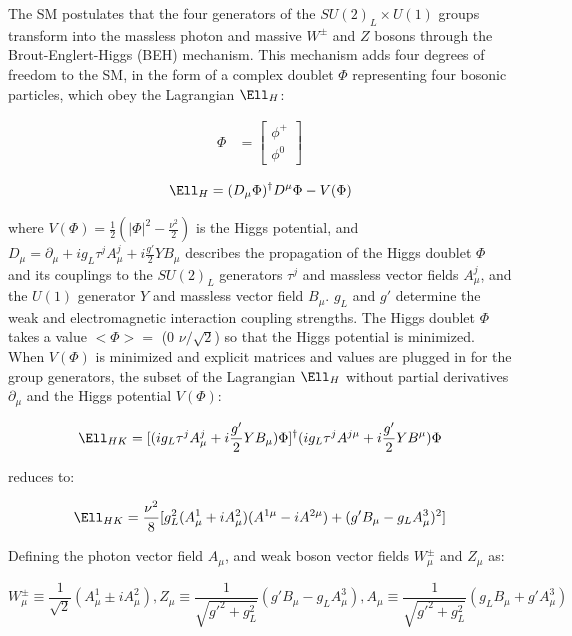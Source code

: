 The SM postulates that the four generators of the $SU(2)_{L} \times U(1)$ groups transform into the massless 
photon and massive $W^{\pm}$ and $Z$ bosons through the Brout-Englert-Higgs (BEH) mechanism.  This mechanism 
adds four degrees of freedom to the SM, in the form of a complex doublet $\Phi$ representing four bosonic 
particles, which obey the Lagrangian $\Ell_{H}$:

\begin{align}
	\Phi &= \begin{bmatrix}
	\phi^{+} \\
	\phi^{0}
	\end{bmatrix}
\end{align}

\begin{equation}
	\Ell_{H} = (D_{\mu}\Phi)^{\dagger}D^{\mu}\Phi - V(\Phi)
\end{equation}

where $V(\Phi) = \frac{1}{2}(|\Phi|^{2} - \frac{\nu^{2}}{2})$ is the Higgs potential, and 
$D_{\mu} = \partial_{\mu} + ig_{L}\tau^{j}A^{j}_{\mu} + i\frac{g'}{2}YB_{\mu}$ describes the propagation 
of the Higgs doublet $\Phi$ and its couplings to the $SU(2)_L$ generators $\tau^{j}$ and massless vector 
fields $A^{j}_{\mu}$, and the $U(1)$ generator $Y$ and massless vector field $B_{\mu}$.  $g_{L}$ and 
$g'$ determine the weak and electromagnetic interaction coupling strengths.  The Higgs doublet $\Phi$ takes a 
value $<\Phi> =$ (0  $\nu/\sqrt{2}$) so that the Higgs potential is minimized.  When $V(\Phi)$ is minimized 
and explicit matrices and values are plugged in for the group generators, the subset 
of the Lagrangian $\Ell_{H}$ without partial derivatives $\partial_{\mu}$ and the Higgs potential $V(\Phi)$:

\begin{equation}
	\Ell_{HK} = [(ig_{L}\tau^{j}A^{j}_{\mu} + i\frac{g'}{2}YB_{\mu})\Phi]^{\dagger}(ig_{L}\tau^{j}A^{j\mu} + i\frac{g'}{2}YB^{\mu})\Phi
\end{equation}

reduces to:

\begin{equation}
	\Ell_{HK} = \frac{\nu^{2}}{8}[g^{2}_{L}(A^{1}_{\mu} + iA^{2}_{\mu})(A^{1\mu} - iA^{2\mu}) + (g'B_{\mu} - g_{L}A^{3}_{\mu})^{2}]
\end{equation}

Defining the photon vector field $A_{\mu}$, and weak boson vector fields $W^{\pm}_{\mu}$ and $Z_{\mu}$ as:

\begin{equation}
	W^{\pm}_{\mu} \equiv \frac{1}{\sqrt{2}}(A^{1}_{\mu} \pm iA^{2}_{\mu}), 
	Z_{\mu} \equiv \frac{1}{\sqrt{g'^{2} + g^{2}_{L}}}(g'B_{\mu} - g_{L}A^{3}_{\mu}), 
	A_{\mu} \equiv \frac{1}{\sqrt{g'^{2} + g^{2}_{L}}}(g_{L}B_{\mu} + g'A^{3}_{\mu})
\end{equation}

